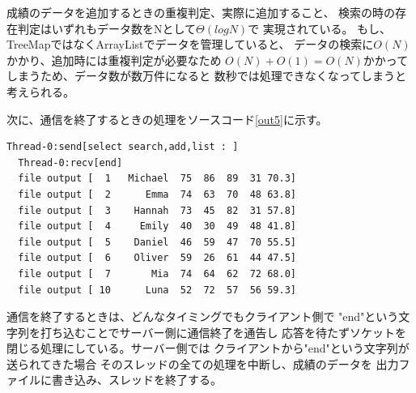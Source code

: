 \documentclass[dvipdfmx]{jsarticle}
\begin{document}
成績のデータを追加するときの重複判定、実際に追加すること、
検索の時の存在判定はいずれもデータ数をNとして$\Theta(logN)$で
実現されている。
もし、TreeMapではなくArrayListでデータを管理していると、
データの検索に$O(N)$かかり、追加時には重複判定が必要なため
$O(N)+O(1) = O(N)$かかってしまうため、データ数が数万件になると
数秒では処理できなくなってしまうと考えられる。

次に、通信を終了するときの処理をソースコード\ref{out5}に示す。
\begin{lstlisting}[caption=通信終了の処理,label=out5]
  Thread-0:send[select search,add,list : ]
  Thread-0:recv[end]
  file output [  1   Michael  75  86  89  31 70.3]
  file output [  2      Emma  74  63  70  48 63.8]
  file output [  3    Hannah  73  45  82  31 57.8]
  file output [  4     Emily  40  30  49  48 41.8]
  file output [  5    Daniel  46  59  47  70 55.5]
  file output [  6    Oliver  59  26  61  44 47.5]
  file output [  7       Mia  74  64  62  72 68.0]
  file output [ 10      Luna  52  72  57  56 59.3]
\end{lstlisting}

通信を終了するときは、どんなタイミングでもクライアント側で
"end"という文字列を打ち込むことでサーバー側に通信終了を通告し
応答を待たずソケットを閉じる処理にしている。サーバー側では
クライアントから"end"という文字列が送られてきた場合
そのスレッドの全ての処理を中断し、成績のデータを
出力ファイルに書き込み、スレッドを終了する。
\end{document}
